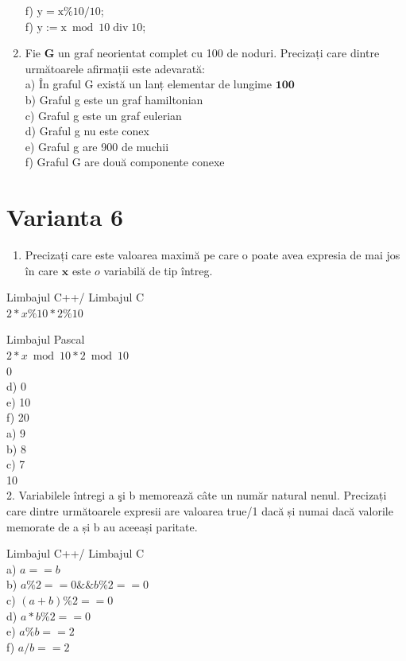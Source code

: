 \documentclass[10pt]{article}
\begin{document}
\begin{enumerate}
f) $\mathrm{y}=\mathrm{x} \% 10 / 10$;\\
f) $\mathrm{y}:=\mathrm{x} \bmod 10 \operatorname{div} 10$;
  \item Fie $\mathbf{G}$ un graf neorientat complet cu 100 de noduri. Precizați care dintre următoarele afirmații este adevarată:\\
a) În graful G există un lanț elementar de lungime $\mathbf{1 0 0}$\\
b) Graful g este un graf hamiltonian\\
c) Graful g este un graf eulerian\\
d) Graful g nu este conex\\
e) Graful g are 900 de muchii\\
f) Graful G are două componente conexe
\end{enumerate}

\section*{Varianta 6}
\begin{enumerate}
  \item Precizați care este valoarea maximă pe care o poate avea expresia de mai jos în care $\mathbf{x}$ este $o$ variabilă de tip întreg.
\end{enumerate}

Limbajul C++/ Limbajul C\\
$2 * x \% 10 * 2 \% 10$

Limbajul Pascal\\
$2 * x \bmod 10 * 2 \bmod 10$\\
0\\
d) 0\\
e) 10\\
f) 20\\
a) 9\\
b) 8\\
c) 7\\
10\\
2. Variabilele întregi a şi b memorează câte un număr natural nenul. Precizați care dintre următoarele expresii are valoarea true/1 dacă și numai dacă valorile memorate de a și b au aceeași paritate.

Limbajul C++/ Limbajul C\\
a) $a==b$\\
b) $a \% 2==0 \& \& b \% 2==0$\\
c) $(a+b) \% 2==0$\\
d) $a * b \% 2==0$\\
e) $a \% b==2$\\
f) $a / b==2$
\end{document}
